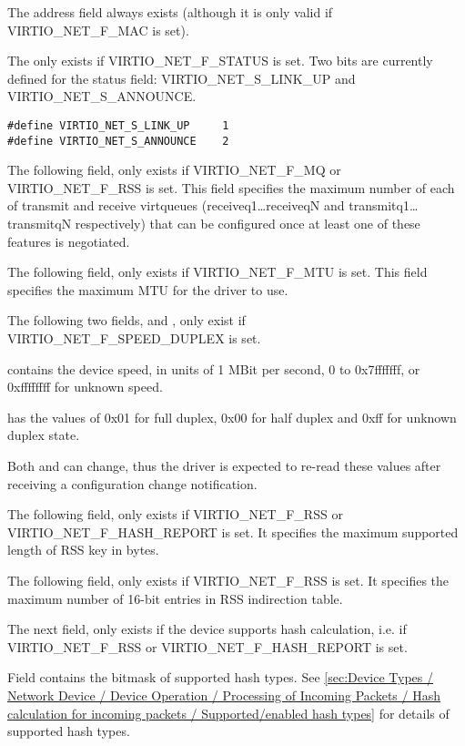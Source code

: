 The  address field always exists (although it is only
valid if VIRTIO_NET_F_MAC is set).

The  only exists if VIRTIO_NET_F_STATUS is set.
Two bits are currently defined for the status field: VIRTIO_NET_S_LINK_UP
and VIRTIO_NET_S_ANNOUNCE.

\begin{lstlisting}
#define VIRTIO_NET_S_LINK_UP     1
#define VIRTIO_NET_S_ANNOUNCE    2
\end{lstlisting}

The following field,  only exists if
VIRTIO_NET_F_MQ or VIRTIO_NET_F_RSS is set. This field specifies the maximum number
of each of transmit and receive virtqueues (receiveq1\ldots receiveqN
and transmitq1\ldots transmitqN respectively) that can be configured once at least one of these features
is negotiated.

The following field,  only exists if VIRTIO_NET_F_MTU
is set. This field specifies the maximum MTU for the driver to
use.

The following two fields,  and , only
exist if VIRTIO_NET_F_SPEED_DUPLEX is set.

 contains the device speed, in units of 1 MBit per
second, 0 to 0x7fffffff, or 0xffffffff for unknown speed.

 has the values of 0x01 for full duplex, 0x00 for
half duplex and 0xff for unknown duplex state.

Both  and  can change, thus the driver
is expected to re-read these values after receiving a
configuration change notification.

The following field,  only exists if VIRTIO_NET_F_RSS or VIRTIO_NET_F_HASH_REPORT is set.
It specifies the maximum supported length of RSS key in bytes.

The following field,  only exists if VIRTIO_NET_F_RSS is set.
It specifies the maximum number of 16-bit entries in RSS indirection table.

The next field,  only exists if the device supports hash calculation,
i.e. if VIRTIO_NET_F_RSS or VIRTIO_NET_F_HASH_REPORT is set.

Field  contains the bitmask of supported hash types.
See \ref{sec:Device Types / Network Device / Device Operation / Processing of Incoming Packets / Hash calculation for incoming packets / Supported/enabled hash types} for details of supported hash types.

